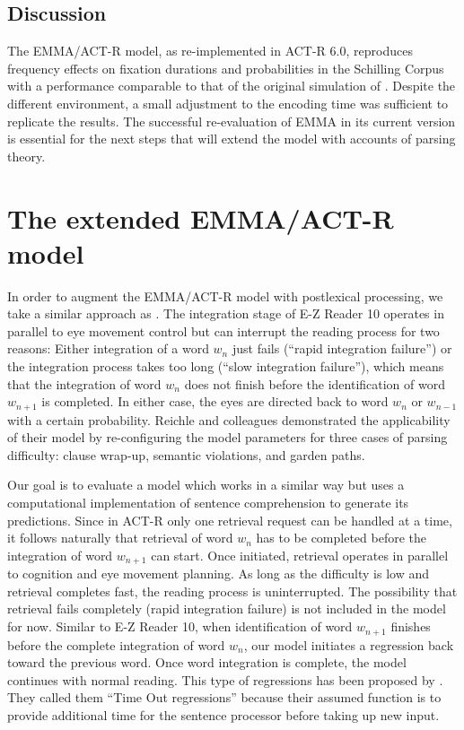 \subsection{Discussion}
The EMMA/ACT-R model, as re-implemented in ACT-R 6.0, reproduces frequency effects on fixation durations and probabilities in the Schilling Corpus with a performance comparable to that of the original simulation of \cite{Salvucci2001}.  Despite the different environment, a small adjustment to the encoding time was sufficient to replicate the results.  
The successful re-evaluation of EMMA in its current version is essential for the next steps that will extend the model with accounts of parsing theory.

\section{The extended EMMA/ACT-R model}
In order to augment the EMMA/ACT-R model with postlexical processing, we take a similar approach as \cite{ReichleWarrenMcConnell2009}.  The integration stage of E-Z Reader 10 operates in parallel to eye movement control but can interrupt the reading process for two reasons: Either integration of a word $w_n$ just fails (``rapid integration failure'') or the integration process takes too long (``slow integration failure''), which means that the integration of word $w_n$ does not finish before the identification of word $w_{n+1}$ is completed.
In either case, the eyes are directed back to word $w_n$ or $w_{n-1}$ with a certain probability.  
Reichle and colleagues demonstrated the applicability of their model by re-configuring the model parameters for three cases of parsing difficulty: clause wrap-up, semantic violations, and garden paths. 

Our goal is to evaluate a model which works in a similar way but uses a computational implementation of sentence comprehension to generate its predictions. 
Since in ACT-R only one retrieval request can be handled at a time, it follows naturally that retrieval of word $w_{n}$ has to be completed before the integration of word $w_{n+1}$ can start.  Once initiated, retrieval operates in parallel to cognition and eye movement planning. As long as the difficulty is low and retrieval completes fast, the reading process is uninterrupted.  The possibility that retrieval fails completely (rapid integration failure) is not included in the model for now.
Similar to E-Z Reader 10, when identification of word $w_{n+1}$ finishes before the complete integration of word $w_n$, our model initiates a regression back toward the previous word.  Once word integration is complete, the model continues with normal reading.  This type of regressions has been proposed by \cite{MitchellEtAl2008}.  They called them  ``Time Out regressions'' because their assumed function is to provide additional time for the sentence processor before taking up new input.

